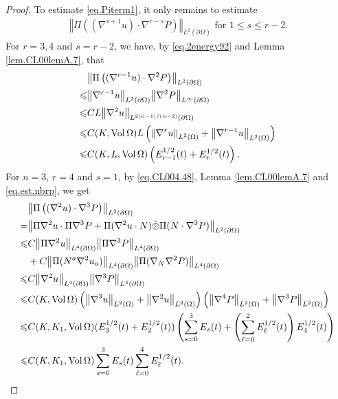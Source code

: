 \documentclass[12pt,reqno]{amsart}
\numberwithin{equation}{section}
\theoremstyle{definition}
\theoremstyle{remark}
\begin{document}
\begin{proof}
To estimate \eqref{eq.Piterm1}, it only remains to estimate
\begin{align}
    {\left\Vert{\Pi\left(({\nabla}^{s+1}u)\cdot {\nabla}^{r-s} {P }\right)}\right\Vert}_{L^2({\partial}\Omega)} \text{ for } 1{\leqslant} s{\leqslant} r-2.
\end{align}
For $r=3,4$ and $s=r-2$, we have, by \eqref{eq.2energy92} and Lemma \ref{lem.CL00lemA.7}, that
\begin{align}
  &{\left\Vert{\Pi\left(({\nabla}^{r-1}u)\cdot {\nabla}^2 {P }\right)}\right\Vert}_{L^2({\partial}\Omega)}{\nonumber}\\
  {\leqslant}& {\left\Vert{{\nabla}^{r-1} u}\right\Vert}_{L^2({\partial}\Omega)}{\left\Vert{{\nabla}^2 {P }}\right\Vert}_{L^\infty({\partial}\Omega)}{\nonumber}\\
  {\leqslant}& CL{\left\Vert{{\nabla}^2 u}\right\Vert}_{L^{2(n-1)/(n-2)}({\partial}\Omega)}{\nonumber}\\
  {\leqslant} &C(K,{\mathrm{Vol}\,}\Omega)L\left({\left\Vert{{\nabla}^r u}\right\Vert}_{L^2(\Omega)}+{\left\Vert{{\nabla}^{r-1} u}\right\Vert}_{L^2(\Omega)}\right){\nonumber}\\
  {\leqslant} &C(K,L,{\mathrm{Vol}\,}\Omega)\left(E_{r-1}^{1/2}(t)+E_r^{1/2}(t)\right).
\end{align}
For $n=3$, $r=4$ and $s=1$, by \eqref{eq.CL004.48}, Lemma \ref{lem.CL00lemA.7} and \eqref{eq.est.nbrp}, we get
\begin{align}\label{eq.piup.1}
  &{\left\Vert{\Pi\left(({\nabla}^2u)\cdot {\nabla}^3 {P }\right)}\right\Vert}_{L^2({\partial}\Omega)}{\nonumber}\\
  =&{\left\Vert{\Pi{\nabla}^2u\cdot \Pi{\nabla}^3 {P }+\Pi({\nabla}^2 u\cdot N)\tilde{\otimes}\Pi(N\cdot {\nabla}^3{P })}\right\Vert}_{L^2({\partial}\Omega)}{\nonumber}\\
  {\leqslant}&C{\left\Vert{\Pi{\nabla}^2 u}\right\Vert}_{L^4({\partial}\Omega)}{\left\Vert{\Pi{\nabla}^3{P }}\right\Vert}_{L^4({\partial}\Omega)}{\nonumber}\\
  & +C{\left\Vert{\Pi(N^a{\nabla}^2 u_a)}\right\Vert}_{L^4({\partial}\Omega)}{\left\Vert{\Pi({\nabla}_N{\nabla}^2 {P })}\right\Vert}_{L^4({\partial}\Omega)}{\nonumber}\\
  {\leqslant} &C{\left\Vert{{\nabla}^2 u}\right\Vert}_{L^4({\partial}\Omega)}{\left\Vert{{\nabla}^3 {P }}\right\Vert}_{L^4({\partial}\Omega)}{\nonumber}\\
  {\leqslant}&C(K,{\mathrm{Vol}\,}\Omega)\left({\left\Vert{{\nabla}^3 u}\right\Vert}_{L^2(\Omega)}+{\left\Vert{{\nabla}^2 u}\right\Vert}_{L^2(\Omega)}\right) \left({\left\Vert{{\nabla}^4 {P }}\right\Vert}_{L^2(\Omega)}+{\left\Vert{{\nabla}^3 {P }}\right\Vert}_{L^2(\Omega)}\right){\nonumber}\\
  {\leqslant}&C(K, K_1,{\mathrm{Vol}\,}\Omega)(E_3^{1/2}(t)+E_2^{1/2}(t))\left(\sum_{s=0}^3 E_s(t)+\left(\sum_{\ell=0}^{2}E_\ell^{1/2}(t)\right)E_4^{1/2}(t)\right){\nonumber}\\
  {\leqslant} &C(K, K_1,{\mathrm{Vol}\,}\Omega)\sum_{s=0}^3 E_s(t)\sum_{\ell=0}^4 E_\ell^{1/2}(t).
\end{align}


\end{proof}
\end{document}
